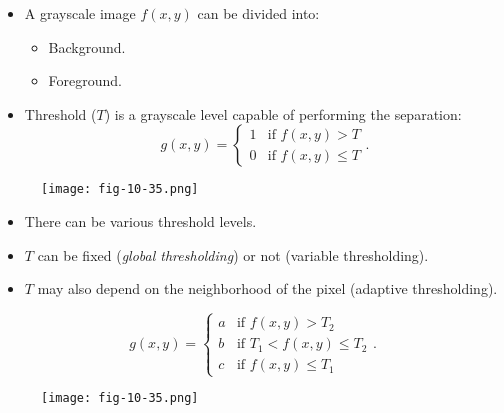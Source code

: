 \begin{frame}
\begin{itemize}
\item A grayscale image $f(x,y)$ can be divided into:
\begin{itemize}
\item Background.
\item Foreground.
\end{itemize}
\item Threshold ($T$) is a grayscale level capable of performing the separation:
\[
g(x,y) = \left \{
\begin{array}{ll}
1 & \text{if } f(x,y) > T \\
0 & \text{if } f(x,y) \leq T
\end{array}
\right ..
\]
\end{itemize}
\begin{figure}[!h]
\texttt{[image: fig-10-35.png]}
\end{figure}
\end{frame}


\begin{frame}%
\begin{itemize}
\item There can be various threshold levels.
\item $T$ can be fixed (\textit{global thresholding}) or not (variable thresholding).
\item $T$ may also depend on the neighborhood of the pixel (adaptive thresholding).
\end{itemize}
\end{frame}

\begin{frame}
\[
g(x,y) = \left \{
\begin{array}{ll}
a & \text{if } f(x,y) > T_{2} \\
b & \text{if } T_{1} < f(x,y) \leq T_{2} \\
c & \text{if } f(x,y) \leq T_{1}
\end{array}
\right ..
\]
\begin{figure}[!h]
\texttt{[image: fig-10-35.png]}
\end{figure}
\end{frame}

